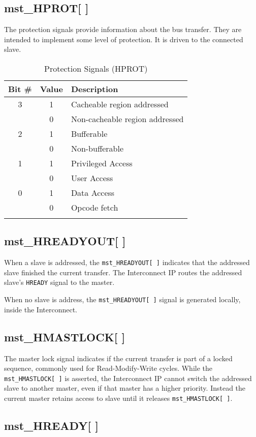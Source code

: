 \subsection{mst\_HPROT[ ]}\label{mst_hprot}

The protection signals provide information about the bus transfer. They
are intended to implement some level of protection. It is driven to the
connected slave.

\begin{longtable}[]{@{}ccl@{}}
\toprule
Bit \# & Value & Description\tabularnewline
\midrule
\endhead
3 & 1 & Cacheable region addressed\tabularnewline
& 0 & Non-cacheable region addressed\tabularnewline
2 & 1 & Bufferable\tabularnewline
& 0 & Non-bufferable\tabularnewline
1 & 1 & Privileged Access\tabularnewline
& 0 & User Access\tabularnewline
0 & 1 & Data Access\tabularnewline
& 0 & Opcode fetch\tabularnewline
\bottomrule
\caption{Protection Signals (HPROT)}
\end{longtable}

\subsection{mst\_HREADYOUT[ ]}\label{mst_hreadyout}

When a slave is addressed, the \texttt{mst\_HREADYOUT[\,]} indicates that the
addressed slave finished the current transfer. The Interconnect IP
routes the addressed slave's \texttt{HREADY} signal to the master.

When no slave is address, the \texttt{mst\_HREADYOUT[\,]} signal is generated
locally, inside the Interconnect.

\subsection{mst\_HMASTLOCK[ ]}\label{mst_hmastlock}

The master lock signal indicates if the current transfer is part of a
locked sequence, commonly used for Read-Modify-Write cycles. While the
\texttt{mst\_HMASTLOCK[\,]} is asserted, the Interconnect IP cannot switch the
addressed slave to another master, even if that master has a higher
priority. Instead the current master retains access to slave until it
releases \texttt{mst\_HMASTLOCK[\,]}.

\subsection{mst\_HREADY[ ]}\label{mst_hready}

